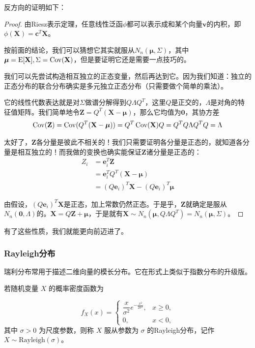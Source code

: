 反方向的证明如下：
\begin{proof}
由Riesz表示定理，任意线性泛函$\phi$都可以表示成和某个向量$\mathbf{v}$的内积，即$\phi(\mathbf{X}) = \mathbf{c}^T\mathbf{X}$。

按前面的结论，我们可以猜想它其实就服从$N_n(\boldsymbol{\mu},\Sigma)$，其中$\boldsymbol{\mu} = \operatorname{E}[\mathbf{X}], \Sigma=\operatorname{Cov}(\mathbf{X})$，但是要证明它还是需要一点技巧的。

我们可以先尝试构造相互独立的正态变量，然后再达到它。因为我们知道：独立的正态分布的联合分布确实是多元独立正态分布（只需要做个简单的乘法）。

它的线性代数表达就是对$\Sigma$做谱分解得到$Q\Lambda Q^T$，这里$Q$是正交的，$\Lambda$是对角的特征值矩阵。我们简单地令$\mathbf{Z}=Q^T(\mathbf{X}-\boldsymbol{\mu})$，那么它均值为$\mathbf{0}$，其协方差
\[
\operatorname{Cov}(\mathbf{Z}) = \operatorname{Cov}(Q^T(\mathbf{X}-\boldsymbol{\mu})) = Q^T\operatorname{Cov}(\mathbf{X})Q = Q^TQ\Lambda Q^TQ = \Lambda
\]

太好了，$\mathbf{Z}$各分量是彼此不相关的！我们只需要证明各分量是正态的，就知道各分量是相互独立的！而我做的变换也确实能保证$\mathbf{Z}$诸分量是正态的：
\begin{align*}
Z_i&=\mathbf{e}_i^T\mathbf{Z}\\
& =\mathbf{e}_i^TQ^T(\mathbf{X}-\boldsymbol{\mu})\\
& = (Q\mathbf{e}_i)^T\mathbf{X} - (Q\mathbf{e}_i)^T\boldsymbol{\mu}
\end{align*}

由假设，$(Q\mathbf{e}_i)^T\mathbf{X}$是正态，加上常数仍然正态。于是乎，$\mathbf{Z}$就确定是服从$N_n(\mathbf{0},\Lambda)$的。$\mathbf{X} = Q\mathbf{Z} + \boldsymbol{\mu}$，于是就有$\mathbf{X}\sim N_n(\boldsymbol{\mu}, Q\Lambda Q^T)=N_n(\boldsymbol{\mu}, \Sigma)$。
\end{proof}

有了这些性质，我们就能更向前迈进了。

\subsubsection{Rayleigh分布}

瑞利分布常用于描述二维向量的模长分布。它在形式上类似于指数分布的升级版。

若随机变量 $X$ 的概率密度函数为

\[
f_X(x) = \begin{cases}
    \dfrac{x}{\sigma^2} e^{-\frac{x^2}{2\sigma^2}}, & x \geq 0,\\
    0, & x < 0,
\end{cases}
\]
其中 $\sigma > 0$ 为尺度参数，则称 $X$ 服从参数为 $\sigma$ 的Rayleigh分布，记作 $X \sim \mathrm{Rayleigh}(\sigma)$。

